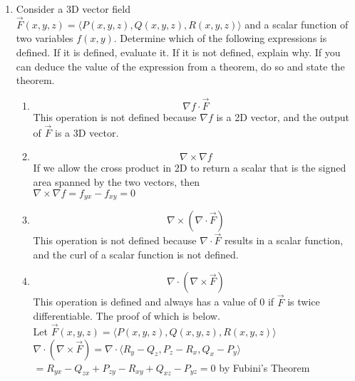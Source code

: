 \begin{enumerate}
	\item Consider a 3D vector field $\vec{F}(x,y,z) = \langle P(x,y,z), Q(x,y,z), R(x,y,z) \rangle$ and a scalar function of two variables $f(x,y)$. Determine which of the following expressions is defined. If it is defined, evaluate it. If it is not defined, explain why. If you can deduce the value of the expression from a theorem, do so and state the theorem.
	\begin{enumerate}[label=\alph*.]
		\item \begin{equation*}
			\nabla f \cdot \vec{F}
		\end{equation*}
		\indent
		This operation is not defined because $\nabla f$ is a 2D vector, and the output of $\vec{F}$ is a 3D vector.\\
		
		\item \begin{equation*}
			\nabla \times \nabla f
		\end{equation*}
		\indent
		If we allow the cross product in 2D to return a scalar that is the signed area spanned by the two vectors, then\\
		$\nabla \times \nabla f = f_{yx} - f_{xy} = 0$\\
		
		\item $$\nabla\times(\nabla\cdot\vec{F})$$
		\indent
		This operation is not defined because $\nabla \cdot \vec{F}$ results in a scalar function, and the curl of a scalar function is not defined.\\
		
		\item $$\nabla \cdot (\nabla \times \vec{F})$$
		\indent
		This operation is defined and always has a value of 0 if $\vec{F}$ is twice differentiable. The proof of which is below.\\
		Let $\vec{F}(x,y,z) = \langle P(x,y,z), Q(x,y,z), R(x,y,z) \rangle$\\
		$\nabla \cdot (\nabla \times \vec{F}) = \nabla \cdot \langle R_y-Q_z, P_z-R_x, Q_x-P_y \rangle$\\
		$= R_{yx}-Q_{zx} + P_{zy}-R_{xy} + Q_{xz}-P_{yz} = 0$ by Fubini's Theorem\\
	\end{enumerate}


\end{enumerate}
